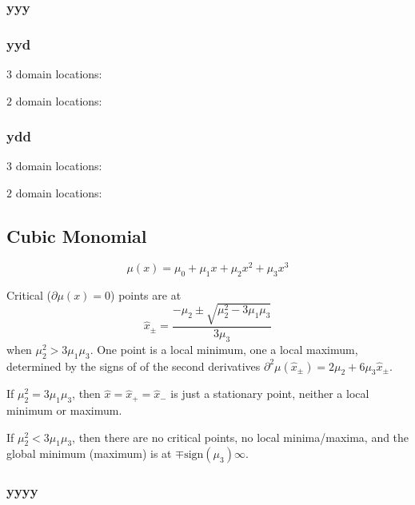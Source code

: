 \subsubsection{yyy}



\subsubsection{yyd}

$3$ domain locations:


$2$ domain locations:


\subsubsection{ydd}

$3$ domain locations:


$2$ domain locations:


\subsection{Cubic Monomial}

\begin{equation}
\mu(x) = \mu_0 + \mu_1 x + \mu_2 x^2 + \mu_3 x^3
\end{equation}

Critical ($\partial\mu(x) = 0$) points are at
\begin{equation}
\hat{x}_{\pm} = \frac{-\mu_2 \pm \sqrt{ \mu_2^{2} - 3 \mu_1 \mu_3 }}{3 \mu_3}
\end{equation}
when $\mu_2^{2} > 3 \mu_1 \mu_3$.
One point is a local minimum, one a local maximum, 
determined by the signs of of the second derivatives
$\partial^2\mu(\hat{x}_{\pm}) = 2 \mu_2 + 6 \mu_3 \hat{x}_{\pm}$.

If $\mu_2^{2} = 3 \mu_1 \mu_3$, 
then $\hat{x} = \hat{x}_{+} = \hat{x}_{-}$ is just a stationary
point, neither a local minimum or maximum.

If $\mu_2^{2} < 3 \mu_1 \mu_3$, then there are no critical points,
no local minima/maxima, and the global minimum (maximum) is at
$\mp\text{sign}(\mu_3)\infty$.


\subsubsection{yyyy}

